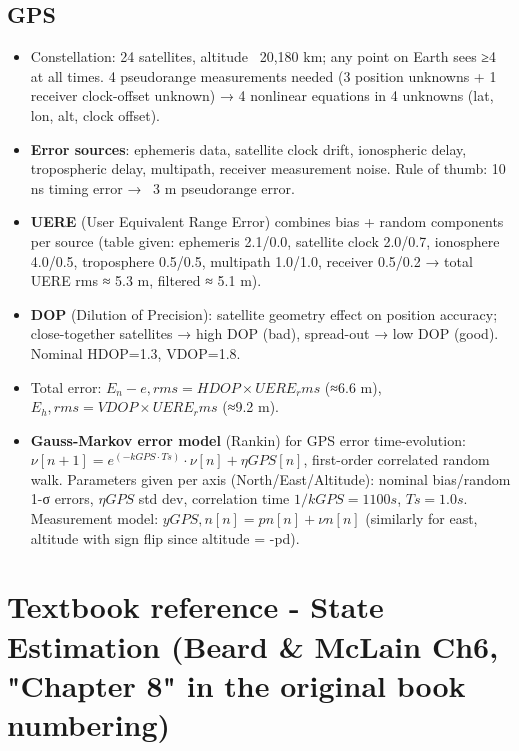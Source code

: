 \documentclass[11pt]{article}
\begin{document}
\subsection{GPS}
\begin{itemize}
\item Constellation: 24 satellites, altitude ~20,180 km; any point on Earth sees ≥4 at all times. 4 pseudorange measurements needed (3 position unknowns + 1 receiver clock-offset unknown) → 4 nonlinear equations in 4 unknowns (lat, lon, alt, clock offset).
\item \textbf{Error sources}: ephemeris data, satellite clock drift, ionospheric delay, tropospheric delay, multipath, receiver measurement noise. Rule of thumb: 10 ns timing error → ~3 m pseudorange error.
\item \textbf{UERE} (User Equivalent Range Error) combines bias + random components per source (table given: ephemeris 2.1/0.0, satellite clock 2.0/0.7, ionosphere 4.0/0.5, troposphere 0.5/0.5, multipath 1.0/1.0, receiver 0.5/0.2 → total UERE rms ≈ 5.3 m, filtered ≈ 5.1 m).
\item \textbf{DOP} (Dilution of Precision): satellite geometry effect on position accuracy; close-together satellites → high DOP (bad), spread-out → low DOP (good). Nominal HDOP=1.3, VDOP=1.8.
\item Total error: $E_n-e,rms = HDOP × UERE_rms$ (≈6.6 m), $E_h,rms = VDOP × UERE_rms$ (≈9.2 m).
\item \textbf{Gauss-Markov error model} (Rankin) for GPS error time-evolution: $ν[n+1] = e^(-kGPS·Ts)·ν[n] + ηGPS[n]$, first-order correlated random walk. Parameters given per axis (North/East/Altitude): nominal bias/random 1-σ errors, $ηGPS$ std dev, correlation time $1/kGPS = 1100 s$, $Ts = 1.0 s$. Measurement model: $yGPS,n[n] = pn[n] + νn[n]$ (similarly for east, altitude with sign flip since altitude = -pd).
\end{itemize}

\section{Textbook reference - State Estimation (Beard \& McLain Ch6, "Chapter 8" in the original book numbering)}
\end{document}
